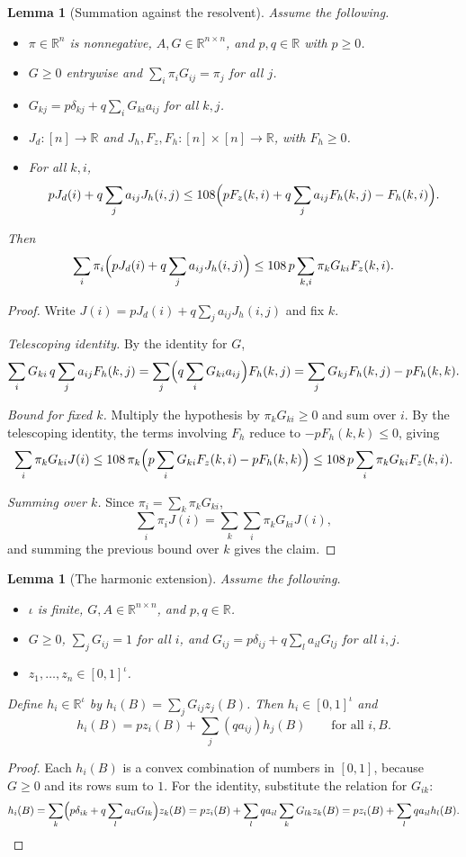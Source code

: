 \documentclass[11pt]{article}
\newtheorem{lemma}[theorem]{Lemma}
\theoremstyle{definition}
\theoremstyle{remark}
\newcommand{\R}{\mathbb{R}}
\begin{document}
\begin{lemma}[Summation against the resolvent]\label{lem:global_sum}
Assume the following.
\begin{itemize}
\item $\pi\in\R^n$ is nonnegative, $A,G\in\R^{n\times n}$, and $p,q\in\R$ with $p\ge0$.
\item $G\ge0$ entrywise and $\sum_i\pi_iG_{ij}=\pi_j$ for all $j$.
\item $G_{kj}=p\delta_{kj}+q\sum_iG_{ki}a_{ij}$ for all $k,j$.
\item $J_d:[n]\to\R$ and $J_h,F_z,F_h:[n]\times[n]\to\R$, with $F_h\ge0$.
\item For all $k,i$,
\[
pJ_d(i)+q\sum_ja_{ij}J_h(i,j)\le108\Bigl(pF_z(k,i)+q\sum_ja_{ij}F_h(k,j)-F_h(k,i)\Bigr).
\]
\end{itemize}
Then
\[
\sum_i\pi_i\Bigl(pJ_d(i)+q\sum_ja_{ij}J_h(i,j)\Bigr)\le108\,p\sum_{k,i}\pi_kG_{ki}F_z(k,i).
\]
\end{lemma}
\begin{proof}
Write $J(i)=pJ_d(i)+q\sum_ja_{ij}J_h(i,j)$ and fix $k$.

\emph{Telescoping identity.} By the identity for $G$,
\[
\sum_iG_{ki}\,q\sum_ja_{ij}F_h(k,j)=\sum_j\Bigl(q\sum_iG_{ki}a_{ij}\Bigr)F_h(k,j)=\sum_jG_{kj}F_h(k,j)-pF_h(k,k).
\]

\emph{Bound for fixed $k$.} Multiply the hypothesis by $\pi_kG_{ki}\ge0$ and sum over $i$. By the telescoping identity, the terms involving $F_h$ reduce to $-pF_h(k,k)\le0$, giving
\[
\sum_i\pi_kG_{ki}J(i)\le108\,\pi_k\Bigl(p\sum_iG_{ki}F_z(k,i)-pF_h(k,k)\Bigr)\le108\,p\sum_i\pi_kG_{ki}F_z(k,i).
\]

\emph{Summing over $k$.} Since $\pi_i=\sum_k\pi_kG_{ki}$,
\[
\sum_i\pi_iJ(i)=\sum_k\sum_i\pi_kG_{ki}J(i),
\]
and summing the previous bound over $k$ gives the claim.
\end{proof}

\begin{lemma}[The harmonic extension]\label{lem:h_props}
Assume the following.
\begin{itemize}
\item $\iota$ is finite, $G,A\in\R^{n\times n}$, and $p,q\in\R$.
\item $G\ge0$, $\sum_jG_{ij}=1$ for all $i$, and $G_{ij}=p\delta_{ij}+q\sum_la_{il}G_{lj}$ for all $i,j$.
\item $z_1,\dots,z_n\in[0,1]^\iota$.
\end{itemize}
Define $h_i\in\R^\iota$ by $h_i(B)=\sum_jG_{ij}z_j(B)$. Then $h_i\in[0,1]^\iota$ and
\[
h_i(B)=pz_i(B)+\sum_j(qa_{ij})h_j(B)\qquad\text{for all } i,B.
\]
\end{lemma}
\begin{proof}
Each $h_i(B)$ is a convex combination of numbers in $[0,1]$, because $G\ge0$ and its rows sum to $1$. For the identity, substitute the relation for $G_{ik}$:
\[
h_i(B)=\sum_k\Bigl(p\delta_{ik}+q\sum_la_{il}G_{lk}\Bigr)z_k(B)=pz_i(B)+\sum_lqa_{il}\sum_kG_{lk}z_k(B)=pz_i(B)+\sum_lqa_{il}h_l(B). \qedhere
\]
\end{proof}
\end{document}
